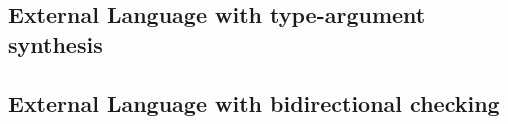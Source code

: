 \subsection{External Language with type-argument synthesis}

\subsection{External Language with bidirectional checking}

\begin{figure}
$$
\begin{array}{lrll}

\end{array}$$
\end{figure}
